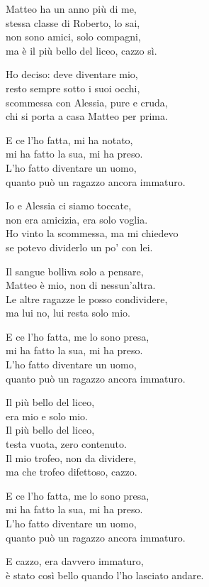 \begin{lyrics}
Matteo ha un anno più di me,\\
stessa classe di Roberto, lo sai,\\
non sono amici, solo compagni,\\
ma è il più bello del liceo, cazzo sì.

Ho deciso: deve diventare mio,\\
resto sempre sotto i suoi occhi,\\
scommessa con Alessia, pure e cruda,\\
chi si porta a casa Matteo per prima.

E ce l’ho fatta, mi ha notato,\\
mi ha fatto la sua, mi ha preso.\\
L’ho fatto diventare un uomo,\\
quanto può un ragazzo ancora immaturo.

Io e Alessia ci siamo toccate,\\
non era amicizia, era solo voglia.\\
Ho vinto la scommessa, ma mi chiedevo\\
se potevo dividerlo un po’ con lei.

Il sangue bolliva solo a pensare,\\
Matteo è mio, non di nessun’altra.\\
Le altre ragazze le posso condividere,\\
ma lui no, lui resta solo mio.

E ce l’ho fatta, me lo sono presa,\\
mi ha fatto la sua, mi ha preso.\\
L’ho fatto diventare un uomo,\\
quanto può un ragazzo ancora immaturo.

Il più bello del liceo,\\
era mio e solo mio.\\
Il più bello del liceo,\\
testa vuota, zero contenuto.\\
Il mio trofeo, non da dividere,\\
ma che trofeo difettoso, cazzo.

E ce l’ho fatta, me lo sono presa,\\
mi ha fatto la sua, mi ha preso.\\
L’ho fatto diventare un uomo,\\
quanto può un ragazzo ancora immaturo.

E cazzo, era davvero immaturo,\\
è stato così bello quando l’ho lasciato andare.
\end{lyrics}


